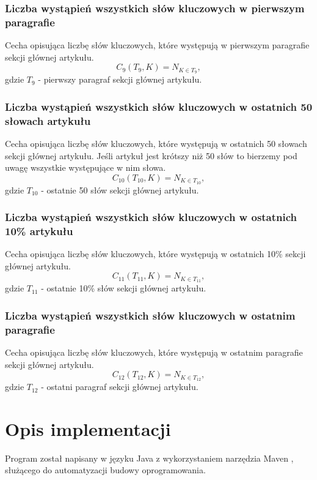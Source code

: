 \documentclass{classrep}
\begin{document}
\subsubsection{Liczba wystąpień wszystkich słów kluczowych w pierwszym paragrafie}
Cecha opisująca liczbę słów kluczowych, które występują w pierwszym paragrafie sekcji głównej artykułu.
\begin{equation}
            C_{9}(T_{9},K) = N_{K \in T_{9}},
 \end{equation}	
 gdzie $T_{9}$ - pierwszy paragraf sekcji głównej artykułu.

\subsubsection{Liczba wystąpień wszystkich słów kluczowych w ostatnich 50 słowach artykułu}
Cecha opisująca liczbę słów kluczowych, które występują w ostatnich 50 słowach sekcji głównej artykułu. Jeśli artykuł jest krótszy niż 50 słów to bierzemy pod uwagę wszystkie występujące w nim słowa.
\begin{equation}
            C_{10}(T_{10},K) = N_{K \in T_{10}},
 \end{equation}	
 gdzie $T_{10}$ - ostatnie 50 słów sekcji głównej artykułu.

\subsubsection{Liczba wystąpień wszystkich słów kluczowych w ostatnich 10\% artykułu}
Cecha opisująca liczbę słów kluczowych, które występują w ostatnich 10\% sekcji głównej artykułu.
\begin{equation}
            C_{11}(T_{11},K) = N_{K \in T_{11}},
 \end{equation}	
 gdzie $T_{11}$ - ostatnie 10\% słów sekcji głównej artykułu.

\subsubsection{Liczba wystąpień wszystkich słów kluczowych w ostatnim paragrafie}
Cecha opisująca liczbę słów kluczowych, które występują w ostatnim paragrafie sekcji głównej artykułu.
\begin{equation}
            C_{12}(T_{12},K) = N_{K \in T_{12}},
 \end{equation}	
 gdzie $T_{12}$ - ostatni paragraf sekcji głównej artykułu.

\section{Opis implementacji}
Program został napisany w języku Java z wykorzystaniem narzędzia Maven \cite{Maven}, służącego do automatyzacji budowy oprogramowania. \newline
\end{document}
